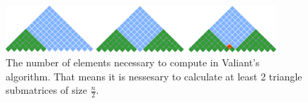 \begin{figure}
    \centering
    \captionsetup{justification=centering}
    \includegraphics[width=0.9\textwidth]{pictures/valsubstring.pdf}
    \caption{The number of elements necessary to compute in Valiant's algorithm. That means it is nessesary to calculate at least 2 triangle submatrices of size $\frac{n}{2}$.}
    \label{fig5}
\end{figure}
